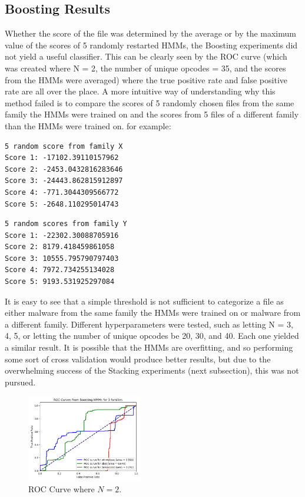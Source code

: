 \documentclass[12pt]{article}
\begin{document}
 \subsection{Boosting Results}
Whether the score of the file was determined by the average or by the maximum value of the scores of 5 randomly restarted HMMs, the Boosting experiments did not yield a useful classifier. This can be clearly seen by the ROC curve (which was created where N = 2, the number of unique opcodes = 35, and the scores from the HMMs were averaged) where the true positive rate and false positive rate are all over the place. A more intuitive way of understanding why this method failed is to compare the scores of 5 randomly chosen files from the same family the HMMs were trained on and the scores from 5 files of a different family than the HMMs were trained on. 
for example:
\begin{lstlisting}
5 random score from family X
Score 1: -17102.39110157962
Score 2: -2453.0432816283646
Score 3: -24443.862815912897
Score 4: -771.3044309566772
Score 5: -2648.110295014743
\end{lstlisting}
\begin{lstlisting}
5 random scores from family Y
Score 1: -22302.30088705916
Score 2: 8179.418459861058
Score 3: 10555.795790797403
Score 4: 7972.734255134028
Score 5: 9193.531925297084
\end{lstlisting}
It is easy to see that a simple threshold is not sufficient to categorize a file as either malware from the same family the HMMs were trained on or malware from a different family. Different hyperparameters were tested, such as letting N = 3, 4, 5, or letting the number of unique opcodes be 20, 30, and 40. Each one yielded a similar result. It is possible that the HMMs are overfitting, and so performing some sort of cross validation would produce better results, but due to the overwhelming success of the Stacking experiments (next subsection), this was not pursued.
\begin{figure}[H]
\centering
\includegraphics[width=0.45\textwidth]{Boosting.png}
\caption{ROC Curve where $N=2$.}
\end{figure}
\end{document}
